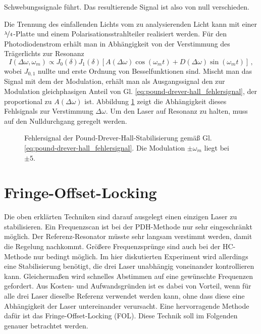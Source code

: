 Schwebungssignale führt. Das resultierende Signal ist also von null
verschieden.\par
Die Trennung des einfallenden Lichts vom zu analysierenden Licht kann mit einer
$\nicefrac{\lambda}{4}$-Platte und einem Polarisationsstrahlteiler realisiert
werden. Für den Photodiodenstrom erhält man in Abhängigkeit von der Verstimmung
des Trägerlichts zur Resonanz
\begin{equation}\label{eq:pound-drever-hall_fehlersignal}
	I(\Delta\omega,\omega_m)\propto
	J_0(\delta)J_1(\delta)\left[A(\Delta\omega)\cos{(\omega_mt)}+D(\Delta\omega)\sin{(\omega_mt)}\right]\,,
\end{equation}
wobei $J_{0,1}$ nullte und erste Ordnung von Besselfunktionen sind. Mischt man
das Signal mit dem der Modulation, erhält man als Ausgangssignal den zur
Modulation gleichphasigen Anteil von
Gl. \eqref{eq:pound-drever-hall_fehlersignal}, der proportional zu
$A(\Delta\omega)$ ist.
Abbildung \ref{fig:pound-drever-hall_fehlersignal} zeigt die Abhängigkeit dieses
Fehlsignals zur Verstimmung $\Delta\omega$. Um den Laser auf Resonanz zu halten,
muss auf den Nulldurchgang geregelt werden.
\begin{figure}[h]
	\centering
	\footnotesize
	
	\caption[Hänsch-Couillaud-Stabilisierung - Fehlersignal]{Fehlersignal der
	Pound-Drever-Hall-Stabilisierung gemäß Gl. 
	\eqref{eq:pound-drever-hall_fehlersignal}. Die Modulation $\pm\omega_m$ liegt
	bei $\pm5$.}
	\label{fig:pound-drever-hall_fehlersignal}
\end{figure}

\section{Fringe-Offset-Locking}\label{sec:fringe-offset-locking}
Die oben erklärten Techniken sind darauf ausgelegt einen einzigen Laser zu
stabilisieren. Ein Frequenzscan ist bei der PDH-Methode nur sehr eingeschränkt
möglich. Der Referenz-Resonator müsste sehr langsam verstimmt werden, damit die
Regelung nachkommt. Größere Frequenzsprünge sind auch bei der HC-Methode
nur bedingt möglich. Im hier diskutierten Experiment wird allerdings eine
Stabilisierung benötigt, die drei Laser unabhängig voneinander kontrollieren
kann. Gleichermaßen wird schnelles Abstimmen auf eine gewünschte
Frequenzen gefordert. Aus Kosten- und Aufwandsgründen ist es dabei von Vorteil, wenn für alle drei Laser dieselbe
Referenz verwendet werden kann, ohne dass diese eine Abhängigkeit der Laser
untereinander verursacht. Eine hervorragende Methode dafür ist das
Fringe-Offset-Locking (FOL). Diese Technik soll im Folgenden genauer betrachtet
werden.

